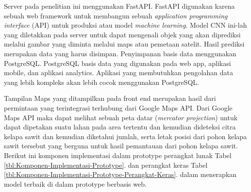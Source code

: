 Server pada penelitian ini menggunakan FastAPI. FastAPI digunakan karena sebuah web framework untuk membangun sebuah \textit{application programming interface} (API) untuk produksi atau model \textit{machine learning}. Model CNN ini-lah yang diletakkan pada server untuk dapat mengenali objek yang akan diprediksi melalui gambar yang diminta melalui maps atau pemetaan satelit. Hasil prediksi merupakan data yang harus disimpan. Penyimpanan basis data menggunakan PostgreSQL. PostgreSQL basis data yang digunakan pada web app, aplikasi mobile, dan aplikasi analytics. Aplikasi yang membutuhkan pengolahan data yang lebih kompleks akan lebih cocok menggunakan PostgreSQL.

Tampilan Maps yang ditampilkan pada front end merupakan hasil dari permintaan yang terintegrasi terhubung dari Google Maps API. Dari Google Maps API maka dapat melihat sebuah peta datar (\textit{mercator projection}) untuk dapat dipetakan suatu lahan pada area tertentu dan kemudian dideteksi citra kelapa sawit dan kemudian diketahui jumlah, serta letak posisi dari pohon kelapa sawit tersebut yang berguna untuk hasil pemantauan dari pohon kelapa sawit. Berikut ini komponen implementasi dalam prototype perangkat lunak Tabel \ref{tbl:Komponen-Implementasi-Prototype}. dan perangkat keras Tabel \ref{tbl:Komponen-Implementasi-Prototype-Perangkat-Keras}. dalam menerapkan model terbaik di dalam prototype berbasis web.


